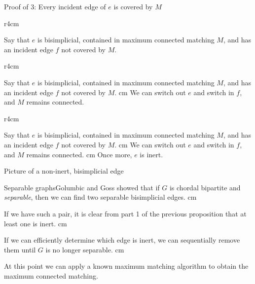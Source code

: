 \documentclass{beamer}
\newcommand{\bframe}[2]{\begin{frame}{#1}#2\end{frame}}
\begin{document}
\bframe{Proof  of 3: Every incident edge of $e$ is covered by $M$}{
\begin{overprint}
		\onslide<1>
			\begin{wrapfigure}{r}{4cm}\vspace{-20pt}\hspace{30pt}
			
			\end{wrapfigure}
			 Say that $e$ is bisimplicial, contained in maximum connected matching $M$, and has an incident edge $f$ not covered by $M$.
		\onslide<2>
			\begin{wrapfigure}{r}{4cm}\vspace{-20pt}\hspace{30pt}
			
			\end{wrapfigure}
			 Say that $e$ is bisimplicial, contained in maximum connected matching $M$, and has an incident edge $f$ not covered by $M$. \vskip 0.5 cm
			We can switch out $e$ and switch in $f$, and $M$ remains connected. 
		\onslide<3>
			\begin{wrapfigure}{r}{4cm}\vspace{-20pt}\hspace{30pt}
			
			\end{wrapfigure}
			 Say that $e$ is bisimplicial, contained in maximum connected matching $M$, and has an incident edge $f$ not covered by $M$. \vskip 0.5 cm
			We can switch out $e$ and switch in $f$, and $M$ remains connected.\vskip 0.5 cm
			Once more, $e$ is inert.
\end{overprint}
}


\bframe{Picture of a non-inert, bisimplicial edge}{
\pause
\begin{center}
\begin{overprint}
	\onslide<2>\hspace{4.5cm}
	\onslide<3>\hspace{4.5cm}
	\onslide<4>\hspace{4.5cm}
\end{overprint}
\end{center}

}

\bframe{Separable graphs}{Golumbic and Goss \cite{gg} showed that if $G$ is chordal bipartite and {\it separable}, then we can find two separable bisimplicial edges.  \pause\vskip 0.5 cm

If we have such a pair, it is clear from part 1 of the previous proposition that at least one is inert. \pause\vskip 0.5 cm

If we can efficiently determine which edge is inert, we can sequentially remove them until $G$ is no longer separable. \pause \vskip 0.5 cm

At this point we can apply a known maximum matching algorithm to obtain the maximum connected matching.
 }
\end{document}
